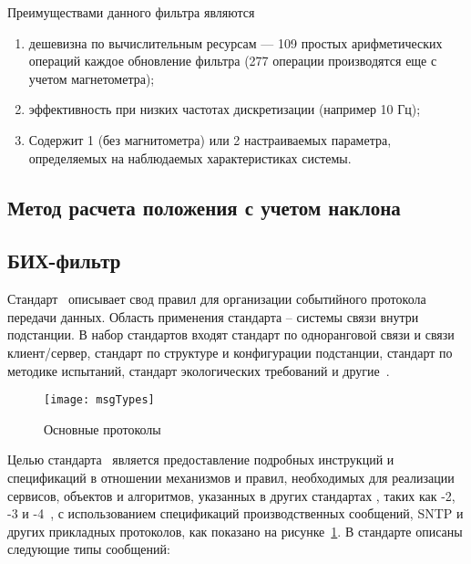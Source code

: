 Преимуществами данного фильтра являются 

\begin{enumerate}

    \item дешевизна по вычислительным ресурсам — 109 простых арифметических операций каждое обновление фильтра
    (277 операции производятся еще с учетом магнетометра);
    \item эффективность при низких частотах дискретизации (например 10 Гц);
    \item Содержит 1 (без магнитометра) или 2 настраиваемых параметра, определяемых на наблюдаемых характеристиках системы.
\end{enumerate}


\subsection{Метод расчета положения с учетом наклона}


\subsection{БИХ-фильтр}


Стандарт \iecStd\ описывает свод правил для организации событийного протокола
передачи данных. Область применения стандарта -- системы связи внутри подстанции.
В набор стандартов входят стандарт по одноранговой связи и связи клиент/сервер,
стандарт по структуре и конфигурации подстанции, стандарт по методике испытаний,
стандарт экологических требований и другие~\cite{iec_description}.

\begin{figure}[ht]
    \centering
    \texttt{[image: msgTypes]}
    \caption{Основные протоколы \iecStd}
    \label{pic::domain::msg_types}
\end{figure}

Целью стандарта \ является предоставление подробных
инструкций и
спецификаций в отношении механизмов и правил, необходимых для реализации сервисов,
объектов и алгоритмов, указанных в других стандартах \iec, таких как
-2, -3 и -4~\cite{IEC61850_7_2, IEC61850_7_3,
IEC61850_7_4}, с использованием спецификаций производственных сообщений,
SNTP и других прикладных протоколов, как показано
на рисунке~\ref{pic::domain::msg_types}.
В стандарте описаны следующие типы сообщений:


